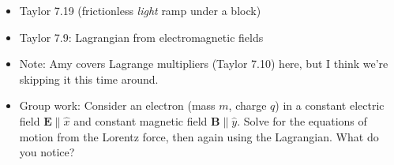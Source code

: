 \documentclass[10pt]{article}
\begin{document}
\begin{itemize}

    \item Taylor 7.19 (frictionless \textit{light} ramp under a block)

    \item Taylor 7.9: Lagrangian from electromagnetic fields

    \item Note: Amy covers Lagrange multipliers (Taylor 7.10) here, but I think we're skipping it this time around. 



    \item Group work: Consider an electron (mass $m$, charge $q$) in a constant electric field $\textbf{E} \parallel \hat{x}$ and constant magnetic field $\textbf{B} \parallel \hat{y}$. Solve for the equations of motion from the Lorentz force, then again using the Lagrangian. What do you notice?

\end{itemize}
\end{document}
